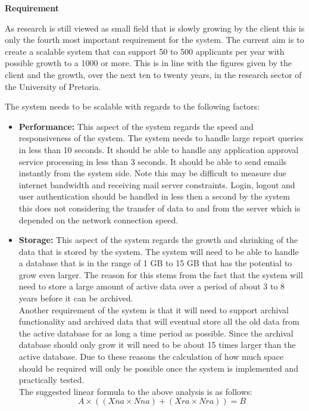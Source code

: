 \begin{flushleft}
\vspace{0.1in}

\textbf{Requirement}

As research is still viewed as small field that is slowly growing by the client this is only the fourth most important requirement for the system. The current aim is to create a scalable system that can support 50 to 500 applicants per year with possible growth to a 1000 or more. This is in line with the figures given by the client and the growth, over the next ten to twenty years, in the research sector of the University of Pretoria.\\
\vspace{0.05in}

The system needs to be scalable with regards to the following factors:
\begin{itemize}

\item\textbf{Performance:} This aspect of the system regards the speed and responsiveness of the system.
The system needs to handle large report queries in less than 10 seconds. It should be able to handle any application approval service processing in less than 3 seconds. It should be able to send emails instantly from the system side. Note this may be difficult to measure due internet bandwidth and receiving mail server constraints. Login, logout and user authentication should be handled in less then a second by the system this does not considering the transfer of data to and from the server which is depended on the network connection speed.\\

\item\textbf{Storage:} This aspect of the system regards the growth and shrinking of the data that is stored by the system.
The system will need to be able to handle a database that is in the range of 1 GB to 15 GB that has the potential to grow even larger. The reason for this stems from the fact that the system will need to store a large amount of active data over a period of about 3 to 8 years before it can be archived.
\\Another requirement of the system is that it will need to support archival functionality and archived data that will eventual store all the old data from the active database for as long a time period as possible. Since the archival database should only grow it will need to be about 15 times larger than the active database. Due to these reasons the calculation of how much space should be required will only be possible once the system is implemented and practically tested.\\The suggested linear formula to the above analysis is as follows: 
\begin{equation}
A \times ( (Xna \times Nna) + (Xra \times Nra) ) = B
\end{equation}


\end{itemize}
\end{flushleft}
